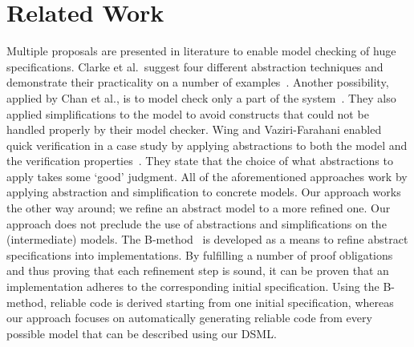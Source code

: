 \section{Related Work}
\label{sec:exploring-boundaries:Related_Work}
Multiple proposals are presented in literature to enable model checking of huge specifications.
Clarke et al.\ suggest four different abstraction techniques and demonstrate their practicality on a number of examples~\cite{Clarke1994}.
Another possibility, applied by Chan et al., is to model check only a part of the system~\cite{Chan1998}.
They also applied simplifications to the model to avoid constructs that could not be handled properly by their model checker.
Wing and Vaziri-Farahani enabled quick verification in a case study by applying abstractions to both the model and the verification properties~\cite{Wing1995}.
They state that the choice of what abstractions to apply takes some `good' judgment.
All of the aforementioned approaches work by applying abstraction and simplification to concrete models.
Our approach works the other way around; we refine an abstract model to a more refined one.
Our approach does not preclude the use of abstractions and simplifications on the (intermediate) models.
The B-method~\cite{Abrial1991} is developed as a means to refine abstract specifications into implementations.
By fulfilling a number of proof obligations and thus proving that each refinement step is sound, it can be proven that an implementation adheres to the corresponding initial specification.
Using the B-method, reliable code is derived starting from one initial specification, whereas our approach focuses on automatically generating reliable code from every possible model that can be described using our DSML. 